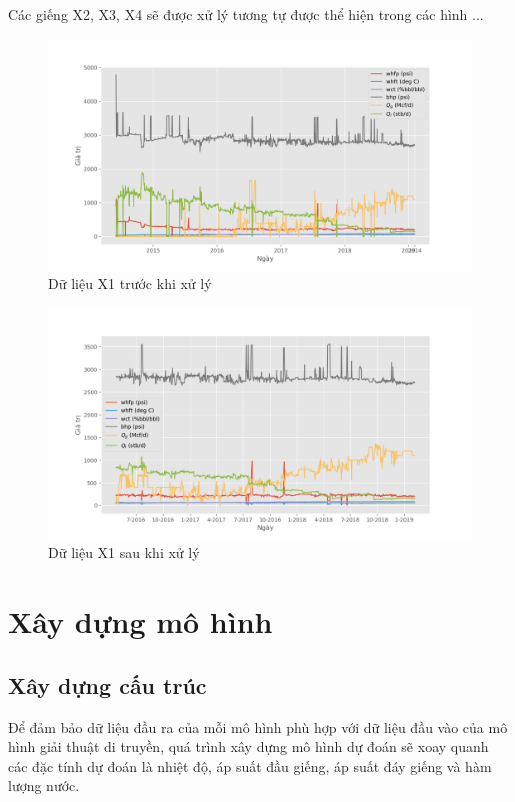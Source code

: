 \documentclass[12pt,a4paper]{report}
\begin{document}
Các giếng X2, X3, X4 sẽ được xử lý tương tự được thể hiện trong các hình ...

	\begin{figure}[h]
		\centering
		\includegraphics[scale=.6]{fig/before-process.png}
		\caption{Dữ liệu X1 trước khi xử lý}
		\label{fig:before-process}
	\end{figure}
	\begin{figure}[h]
		\centering
		\includegraphics[scale=.6]{fig/after-process.png}
		\caption{Dữ liệu X1 sau khi xử lý}
		\label{fig:after-process}
	\end{figure}

\clearpage

\section{Xây dựng mô hình}
\subsection{Xây dựng cấu trúc}
Để đảm bảo dữ liệu đầu ra của mỗi mô hình phù hợp với dữ liệu đầu vào của mô hình giải thuật di truyền, quá trình xây dựng mô hình dự đoán sẽ xoay quanh các đặc tính dự đoán là nhiệt độ, áp suất đầu giếng, áp suất đáy giếng và hàm lượng nước.
\end{document}
